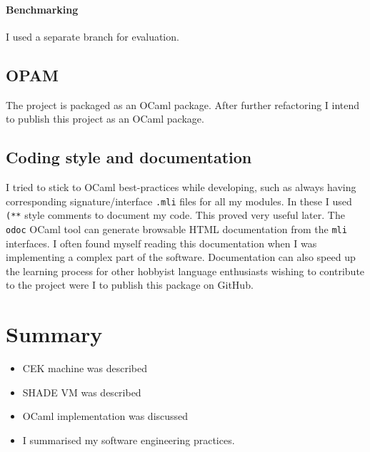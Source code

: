 \documentclass[class=article, crop=false]{standalone}
\begin{document}
\paragraph{Benchmarking} I used a separate branch for evaluation.

\subsection{OPAM}

The project is packaged as an OCaml package. After further refactoring I intend to publish this project as an OCaml package.

\subsection{Coding style and documentation}

I tried to stick to OCaml best-practices while developing, such as always having corresponding signature/interface \verb|.mli| files
for all my modules. In these I used \verb|(**| style comments to document my code. This proved very useful later.
The \verb|odoc| OCaml tool can generate browsable HTML documentation from the \verb|mli| interfaces. I often found myself reading
this documentation when I was implementing a complex part of the software. Documentation can also speed up the learning process
for other hobbyist language enthusiasts wishing to contribute to the project were I to publish this package on GitHub.

\section{Summary}

\begin{itemize}
    \item CEK machine was described
    \item SHADE VM was described
    \item OCaml implementation was discussed
    \item I summarised my software engineering practices.
\end{itemize}
\end{document}
